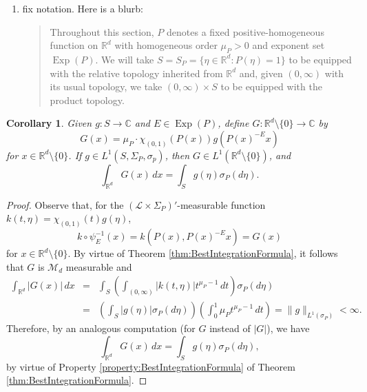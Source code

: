 \documentclass[11pt]{article}
\newtheorem{corollary}[theorem]{Corollary}
\newcommand\Exp{\operatorname{Exp}}
\begin{document}
{\begin{enumerate}
\begin{quote}
    \end{quote}
    \item fix notation. Here is a blurb:
    \begin{quote}
\noindent Throughout this section, $P$ denotes a fixed positive-homogeneous function on $\mathbb{R}^d$ with homogeneous order $\mu_P>0$ and exponent set $\Exp(P)$. We will take $S=S_P=\{\eta\in\mathbb{R}^d:P(\eta)=1\}$ to be equipped with the relative topology inherited from $\mathbb{R}^d$ and, given $(0,\infty)$ with its usual topology, we take $(0,\infty)\times S$ to be equipped with the product topology. 
    \end{quote}
\end{enumerate}}

  
 \begin{corollary}\label{cor:IntegrateOnS}
Given $g:S\to\mathbb{C}$ and $E\in\Exp(P)$, define $G:\mathbb{R}^d\setminus \{0\}\to\mathbb{C}$ by
\begin{equation*}
G(x)=\mu_P\cdot \chi_{(0,1)}(P(x))g(P(x)^{-E}x)
\end{equation*}
for $x\in\mathbb{R}^d\setminus\{0\}$. If $g\in L^1(S,\Sigma_P,\sigma_p)$, then $G\in L^1(\mathbb{R}^d\setminus\{0\})$, and 
\begin{equation*}
    \int_{\mathbb{R}^d}G(x)\,dx=\int_Sg(\eta)\sigma_P(d\eta).
\end{equation*}
\end{corollary}
\begin{proof}
Observe that, for the $(\mathcal{L}\times\Sigma_P)'$-measurable function $k(t,\eta)=\chi_{(0,1)}(t)g(\eta)$,
\begin{equation*}
    k\circ\psi_E^{-1}(x)=k(P(x),P(x)^{-E}x)=G(x)
\end{equation*}
for $x\in\mathbb{R}^d\setminus \{0\}$. By virtue of Theorem \ref{thm:BestIntegrationFormula}, it follows that $G$ is $\mathcal{M}_d$ measurable and 
\begin{eqnarray*}
   \int_{\mathbb{R}^d}|G(x)|\,dx&=&\int_{S}\left(\int_{(0,\infty)}|k(t,\eta)|t^{\mu_P-1}\,dt\right)\sigma_P(d\eta)\\
    &=&\left(\int_S|g(\eta)|\sigma_P(d\eta)\right)\left(\int_0^1 \mu_P t^{\mu_P-1}\,dt\right)=\|g\|_{L^1(\sigma_P)}<\infty.
\end{eqnarray*}
Therefore, by an analogous computation (for $G$ instead of $|G|$), we have
\begin{equation*}
    \int_{\mathbb{R}^d}G(x)\,dx=\int_S g(\eta)\sigma_P(d\eta),
\end{equation*}
by virtue of Property \ref{property:BestIntegrationFormula} of Theorem \ref{thm:BestIntegrationFormula}. 
\end{proof}
\end{document}

